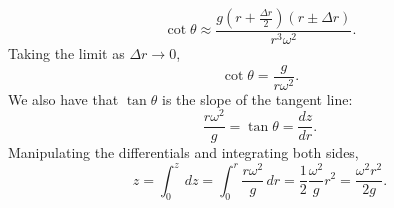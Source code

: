 \documentclass[solutions]{esg8012exam}
\begin{document}
    \begin{equation}
      \cot \theta \approx \frac{g \left(r+\frac{\Delta r}{2}\right) (r\pm \Delta r)}{r^3 \omega^2}.
    \end{equation}
    Taking the limit as $\Delta r \to 0$,
    \begin{equation}
      \cot \theta = \frac{g}{r \omega^2}.
    \end{equation}
    We also have that $\tan\theta$ is the slope of the tangent line:
    $$\frac{r\omega^2}{g} = \tan\theta = \frac{dz}{dr}.$$
    Manipulating the differentials and integrating both sides,
    $$z = \int_0^z\,dz = \int_0^r \frac{r\omega^2}{g}\,dr = \frac{1}{2}\frac{\omega^2}{g}r^2 = \frac{\omega^2 r^2}{2g}.$$

\clearpage
\end{document}
